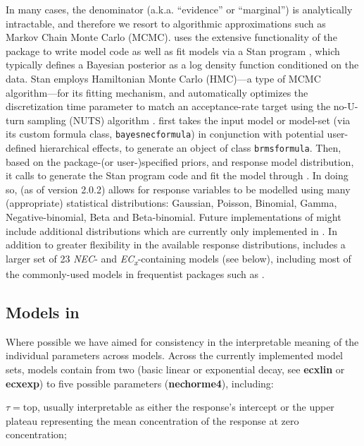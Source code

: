 In many cases, the denominator (a.k.a. ``evidence'' or ``marginal'') is
analytically intractable, and therefore we resort to algorithmic
approximations such as Markov Chain Monte Carlo (MCMC). 
uses the extensive functionality of the  package to write
model code as well as fit models via a Stan program \citep{stan2021},
which typically defines a Bayesian posterior as a log density function
conditioned on the data. Stan employs Hamiltonian Monte Carlo (HMC)---a
type of MCMC algorithm---for its fitting mechanism, and automatically
optimizes the discretization time parameter to match an acceptance-rate
target using the no-U-turn sampling (NUTS) algorithm
\citep{hoffman2014}.  first takes the input model or
model-set (via its custom formula class, \texttt{bayesnecformula}) in
conjunction with potential user-defined hierarchical effects, to
generate an object of class \texttt{brmsformula}. Then, based on the
package-(or user-)specified priors, and response model distribution, it
calls  \citep{Burkner2017, Burkner2018} to generate the Stan
program code and fit the model through  \citep{rstan2021}. In
doing so,  (as of version 2.0.2) allows for response
variables to be modelled using many (appropriate) statistical
distributions: Gaussian, Poisson, Binomial, Gamma, Negative-binomial,
Beta and Beta-binomial. Future implementations of  might
include additional distributions which are currently only implemented in
. In addition to greater flexibility in the available response
distributions,  includes a larger set of 23 \emph{NEC}-
and \emph{EC\textsubscript{x}}-containing models (see below), including
most of the commonly-used models in frequentist packages such as
 \citep{Ritz2016}.

\hypertarget{mdbnc}{%
\subsection{\texorpdfstring{Models in
}{Models in }}\label{mdbnc}}

Where possible we have aimed for consistency in the interpretable
meaning of the individual parameters across models. Across the currently
implemented model sets, models contain from two (basic linear or
exponential decay, see \textbf{ecxlin} or \textbf{ecxexp}) to five
possible parameters (\textbf{nechorme4}), including:

\(\tau = \text{top}\), usually interpretable as either the response's
intercept or the upper plateau representing the mean concentration of
the response at zero concentration;

